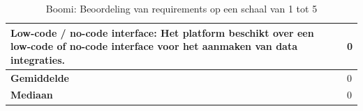 \begin{landscape}
\begin{table}[H]
{\begin{tabular}{|ll|}
\multicolumn{1}{|l|}{Low-code / no-code interface: Het platform beschikt over een low-code of no-code interface voor het aanmaken van data integraties.}                                                                   & 0                            \\ \hline
\multicolumn{1}{|l|}{\textbf{Gemiddelde}}                                                                                                                                                                                  & 0                            \\ \hline
\multicolumn{1}{|l|}{\textbf{Mediaan}}                                                                                                                                                                                     & 0                            \\ \hline
\end{tabular}
}
\caption{Boomi: Beoordeling van requirements op een schaal van 1 tot 5}
\end{table}

\end{landscape}